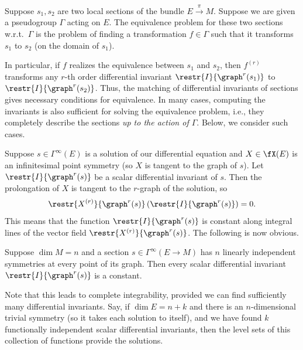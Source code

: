 \begin{defn}
    Suppose $s_1,s_2$ are two local sections of the bundle $E\overset{\pi}{\to}M$. Suppose we are given a pseudogroup $\Gamma$ acting on $E$. The equivalence problem for these two sections w.r.t.\ $\Gamma$ is the problem of finding a transformation $f\in\Gamma$ such that it transforms $s_1$ to $s_2$ (on the domain of $s_1$).
\end{defn}

In particular, if $f$ realizes the equivalence between $s_1$ and $s_2$, then $f^{(r)}$ transforms any $r$-th order differential invariant $\restr{I}{\graph^{r}(s_1)}$ to $\restr{I}{\graph^{r}(s_2)}$. Thus, the matching of differential invariants of sections gives necessary conditions for equivalence. In many cases, computing the invariants is also sufficient for solving the equivalence problem, i.e., they completely describe the sections \emph{up to the action of $\Gamma$}. Below, we consider such cases.

Suppose $s\in\Gamma^\infty(E)$ is a solution of our differential equation and $X\in\fX(E)$ is an infinitesimal point symmetry (so $X$ is tangent to the graph of $s$). Let $\restr{I}{\graph^r(s)}$ be a scalar differential invariant of $s$. Then the prolongation of $X$ is tangent to the $r$-graph of the solution, so
\[\restr{X^{(r)}}{\graph^r(s)}\left(\restr{I}{\graph^r(s)}\right)=0.\]
This means that the function $\restr{I}{\graph^r(s)}$ is constant along integral lines of the vector field $\restr{X^{(r)}}{\graph^r(s)}$. The following is now obvious.

\begin{prop}
    Suppose $\dim M=n$ and a section $s\in\Gamma^\infty(E\to M)$ has $n$ linearly independent symmetries at every point of its graph. Then every scalar differential invariant $\restr{I}{\graph^r(s)}$ is a constant.
\end{prop}

Note that this leads to complete integrability, provided we can find sufficiently many differential invariants. Say, if $\dim E=n+k$ and there is an $n$-dimensional trivial symmetry (so it takes each solution to itself), and we have found $k$ functionally independent scalar differential invariants, then the level sets of this collection of functions provide the solutions.

